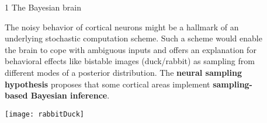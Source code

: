 \newcommand{\blockSpaceOne}{\vspace{1.3cm}}
\newcommand{\interBlockSpaceOne}{\vspace{1.5cm}}
\newcommand{\blockSpaceTwo}{\vspace{1.3cm}}
\newcommand{\interBlockSpaceTwo}{\vspace{.95cm}}
\newcommand{\secondBlockImSpace}{\vspace{.25cm}}
\newcommand{\thirdBlockImSpace}{\vspace{1.125cm}}

\begin{frame} %
	\vspace{-.5cm}
	\begin{columns}
		\begin{column}{.005\textwidth}\end{column}

		
		\begin{column}{0.99\textwidth}
			\begin{columns}[t]

				\begin{column}{.01\textwidth}\end{column}

				\begin{column}{0.32\textwidth}


					\begin{block}{\large 1 The Bayesian brain}
					\blockSpaceOne


					\justifying
					\begin{adjustwidth}{1.cm}{1.cm}
					 The noisy behavior of cortical neurons might be a hallmark of an underlying stochastic computation scheme.
					 Such a scheme would enable the brain to cope with ambiguous inputs and offers an explanation for behavioral effects like bistable images (duck/rabbit) as sampling from different modes of a posterior distribution.
					 The \textbf{neural sampling hypothesis} \cite{fiser2010statistically} proposes that some cortical areas implement \textbf{sampling-based Bayesian inference}.

					\end{adjustwidth}

					\vspace{1.cm}
					\begin{center}
						\texttt{[image: rabbitDuck]}
					\end{center}

					\begin{adjustwidth}{1cm}{1cm}
					

\end{adjustwidth}
\end{block}
\end{column}
\end{columns}
\end{column}
\end{columns}
\end{frame}
